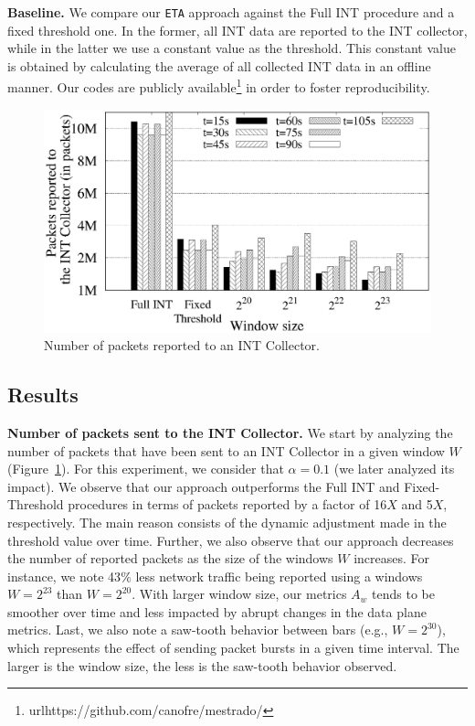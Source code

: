 \noindent\textbf{Baseline.} We compare our \texttt{ETA} approach against the Full INT procedure and a fixed threshold one. In the former, all INT data are reported to the INT collector, while in the latter we use a constant value as the threshold. This constant value is obtained by calculating the average of all collected INT data in an offline manner. Our codes are publicly available\footnote{url{https://github.com/canofre/mestrado/}} in order to foster reproducibility.

\begin{figure}[!htb]
\centering
\includegraphics[scale=0.4]{results/g1a.eps}
\caption{Number of packets reported to an INT Collector.} 
\label{fig-results1}
\end{figure}

\subsection{Results}

\noindent \textbf{Number of packets sent to the INT Collector.} We start by analyzing the number of packets that have been sent to an INT Collector in a given window $W$ (Figure~\ref{fig-results1}). For this experiment, we consider that $\alpha = 0.1$ (we later analyzed its impact). We observe that our approach outperforms the Full INT and Fixed-Threshold procedures in terms of packets reported by a factor of 16$X$ and 5$X$, respectively. The main reason consists of the dynamic adjustment made in the threshold value over time. Further, we also observe that our approach decreases the number of reported packets as the size of the windows $W$ increases. For instance, we note 43$\%$ less network traffic being reported using a windows $W=2^{23}$ than $W=2^{20}$. With larger window size, our metrics $A_w$ tends to be smoother over time and less impacted by abrupt changes in the data plane metrics. Last, we also note a saw-tooth behavior between bars (e.g., $W=2^{30}$), which represents the effect of sending packet bursts in a given time interval. The larger is the window size, the less is the saw-tooth behavior observed.\\ 



